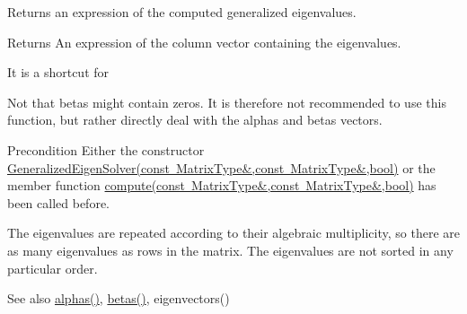 Returns an expression of the computed generalized eigenvalues. 

\begin{DoxyReturn}{Returns}
An expression of the column vector containing the eigenvalues.
\end{DoxyReturn}
It is a shortcut for
\begin{DoxyCode}{0}
\end{DoxyCode}
 Not that betas might contain zeros. It is therefore not recommended to use this function, but rather directly deal with the alphas and betas vectors.

\begin{DoxyPrecond}{Precondition}
Either the constructor \mbox{\hyperlink{class_eigen_1_1_generalized_eigen_solver_a2a3528cbf75f66d3a60af9dc7b12ff65}{Generalized\+Eigen\+Solver(const Matrix\+Type\&,const Matrix\+Type\&,bool)}} or the member function \mbox{\hyperlink{class_eigen_1_1_generalized_eigen_solver_a275910b47dfe5f40211dcb59cfd68f3c}{compute(const Matrix\+Type\&,const Matrix\+Type\&,bool)}} has been called before.
\end{DoxyPrecond}
The eigenvalues are repeated according to their algebraic multiplicity, so there are as many eigenvalues as rows in the matrix. The eigenvalues are not sorted in any particular order.

\begin{DoxySeeAlso}{See also}
\mbox{\hyperlink{class_eigen_1_1_generalized_eigen_solver_a82b1bc41267f46e5c5899d5b084a73bb}{alphas()}}, \mbox{\hyperlink{class_eigen_1_1_generalized_eigen_solver_abeaa6f56cee367b83fd09d428462ca0c}{betas()}}, eigenvectors() 
\end{DoxySeeAlso}
\mbox{\label{class_eigen_1_1_generalized_eigen_solver_a2a6f96bd042068cfc0eafba839b424bd}} 
